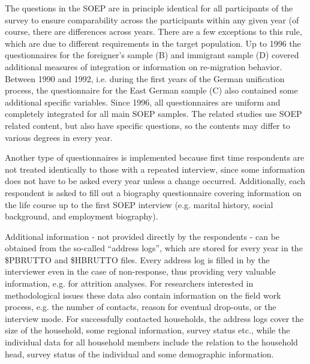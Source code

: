 \documentclass[letterpaper,10pt,openany,onesideH,english]{sphinxmanual}
\begin{document}
The questions in the SOEP are in principle identical for all participants of the survey to ensure comparability across the participants within any given year (of course, there are differences across years. There are a few exceptions to this rule, which are due to different requirements in the target population. Up to 1996 the questionnaires for the foreigner’s sample (B) and immigrant sample (D) covered additional measures of integration or information on re-migration behavior. Between 1990 and 1992, i.e. during the first years of the German unification process, the questionnaire for the East German sample (C) also contained some additional specific variables. Since 1996, all questionnaires are uniform and completely integrated for all main SOEP samples. The related studies use SOEP related content, but also have specific questions, so the contents may differ to various degrees in every year.

Another type of questionnaires is implemented because first time respondents are not treated identically to those with a repeated interview, since some information does not have to be asked every year unless a change occurred. Additionally, each respondent is asked to fill out a biography questionnaire covering information on the life course up to the first SOEP interview (e.g. marital history, social background, and employment biography).

Additional information - not provided directly by the respondents - can be obtained from the so-called “address logs”, which are stored for every year in the \$PBRUTTO and \$HBRUTTO files. Every address log is filled in by the interviewer even in the case of non-response, thus providing very valuable information, e.g. for attrition analyses. For researchers interested in methodological issues these data also contain information on the field work process, e.g. the number of contacts, reason for eventual drop-outs, or the interview mode. For successfully contacted households, the address logs cover the size of the household, some regional information, survey status etc., while the individual data for all household members include the relation to the household head, survey status of the individual and some demographic information.
\end{document}
